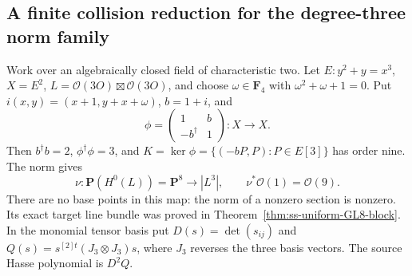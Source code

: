 \subsection{A finite collision reduction for the degree-three norm family}
\label{subsec:ss-level3-collision-reduction}

Work over an algebraically closed field of characteristic two. Let
$E:y^2+y=x^3$, $X=E^2$, $L=\mathcal O(3O)\boxtimes\mathcal O(3O)$,
and choose $\omega\in\mathbf F_4$ with $\omega^2+\omega+1=0$.
Put $i(x,y)=(x+1,y+x+\omega)$, $b=1+i$, and
\[
 \phi=\begin{pmatrix}1&b\\-b^\dagger&1\end{pmatrix}:X\to X.
\]
Then $b^\dagger b=2$, $\phi^\dagger\phi=3$, and
$K=\ker\phi=\{(-bP,P):P\in E[3]\}$ has order nine. The norm gives
\[
 \nu:\mathbf P(H^0(L))=\mathbf P^8\longrightarrow |L^3|,
 \qquad\nu^*\mathcal O(1)=\mathcal O(9).
\]
There are no base points in this map: the norm of a nonzero section
is nonzero. Its exact target line bundle was proved in
Theorem~\ref{thm:ss-uniform-GL8-block}.
In the monomial tensor basis put
$D(s)=\det(s_{ij})$ and $Q(s)=s^{[2]t}(J_3\otimes J_3)s$,
where $J_3$ reverses the three basis vectors. The source Hasse
polynomial is $D^2Q$.

